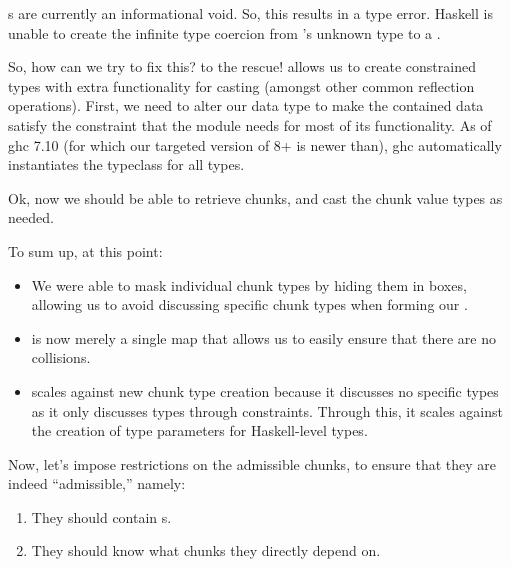 \brokenChunkRetriever{}

\Chunk{}s are currently an informational void. So, this results in a type
error. Haskell is unable to create the infinite
type coercion from 's unknown type to a \QuantityDict{}.

So, how can we try to fix this?  to the rescue!
 allows us to create constrained types with extra
functionality for casting (amongst other common reflection operations). First,
we need to alter our \Chunk{} data type to make the contained data satisfy the
\Typeable{} constraint that the \Typeable{} module needs for most of its
functionality. As of \acs{ghc} 7.10 (for which our targeted version of 8+ is
newer than), \acs{ghc} automatically instantiates the \Typeable{} typeclass for
all types.

\examinableChunkBox{}

Ok, now we should be able to retrieve chunks, and cast the chunk value types as
needed.

\workingChunkRetriever{}

To sum up, at this point:

\begin{itemize}

      \item We were able to mask individual chunk types by hiding them in
            \Chunk{} boxes, allowing us to avoid discussing specific chunk types
            when forming our \ChunkDB{}.

      \item \ChunkDB{} is now merely a single map that allows us to easily
            ensure that there are no \UID{} collisions.

      \item \ChunkDB{} scales against new chunk type creation because it
            discusses no specific types as it only discusses types through
            constraints. Through this, it scales against the creation of type
            parameters for Haskell-level types.

\end{itemize}

Now, let's impose restrictions on the admissible chunks, to ensure that they are
indeed ``admissible,'' namely:

\begin{enumerate}
      
      \item They should contain \UID{}s.
      
      \item They should know what chunks they directly depend on.

\end{enumerate}

